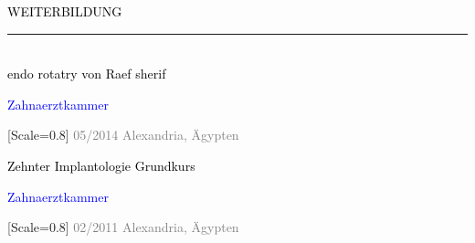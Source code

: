 {\setmainfont{Rubik Medium}\fontsize{11}{14}\selectfont\textcolor{black}{WEITERBILDUNG}}
\\[-4pt]
\textcolor{black}{\rule{\textwidth}{2pt}}\\[-4pt]

{\setmainfont{Rubik Medium}\fontsize{10}{14}\selectfont\textcolor{black}{endo rotatry von Raef sherif}}

{\setmainfont{Rubik Medium}\fontsize{10}{14}\selectfont\textcolor{blue}{Zahnaerztkammer}}

{[Scale=0.8]
\textcolor{gray}{
\faCalendar\hspace{4pt}05/2014\hspace{1.5em}
\faMapMarker*\hspace{4pt}Alexandria, Ägypten
}}\\[-10pt]

\vspace{0.7em}

{\setmainfont{Rubik Medium}\fontsize{10}{14}\selectfont\textcolor{black}{Zehnter Implantologie Grundkurs}}

{\setmainfont{Rubik Medium}\fontsize{10}{14}\selectfont\textcolor{blue}{Zahnaerztkammer}}

{[Scale=0.8]
\textcolor{gray}{
\faCalendar\hspace{4pt}02/2011\hspace{1.5em}
\faMapMarker*\hspace{4pt}Alexandria, Ägypten
}}\\[-10pt]

\vspace{0.7em}
